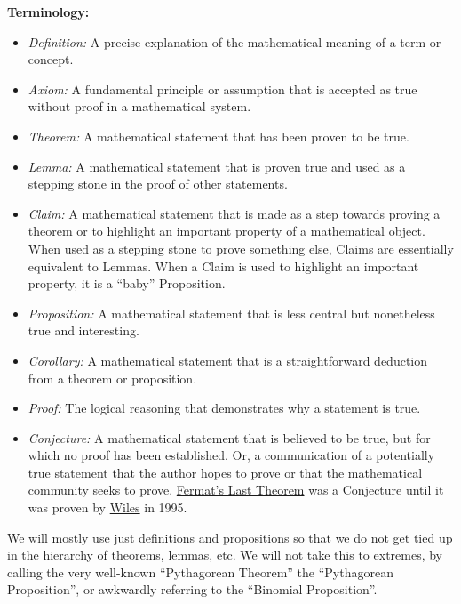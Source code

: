 \textbf{Terminology:}
\begin{itemize}
\item \textit{Definition:} A precise explanation of the mathematical meaning of a term or concept.
\item \textit{Axiom:} A fundamental principle or assumption that is accepted as true without proof in a mathematical system.
\item \textit{Theorem:} A mathematical statement that has been proven to be true.
\item \textit{Lemma:} A mathematical statement that is proven true and used as a stepping stone in the proof of other statements.
\item \textit{Claim:} A mathematical statement that is made as a step towards proving a theorem or to highlight an important property of a mathematical object. When used as a stepping stone to prove something else, Claims are essentially equivalent to Lemmas. When a Claim is used to highlight an important property, it is a ``baby'' Proposition.  
\item \textit{Proposition:} A mathematical statement that is less central but nonetheless true and interesting.
\item \textit{Corollary:} A mathematical statement that is a straightforward deduction from a theorem or proposition.
\item \textit{Proof:} The logical reasoning that demonstrates why a statement is true.
\item \textit{Conjecture:} A mathematical statement that is believed to be true, but for which no proof has been established. Or, a communication of a potentially true statement that the author hopes to prove or that the mathematical community seeks to prove. \href{https://en.wikipedia.org/wiki/Fermat%27s_Last_Theorem}{Fermat's Last Theorem} was a Conjecture until it was proven by \href{https://en.wikipedia.org/wiki/Wiles%27s_proof_of_Fermat%27s_Last_Theorem}{Wiles} in 1995.
\end{itemize}

We will mostly use just definitions and propositions so that we do not get tied up in the hierarchy of theorems, lemmas, etc. We will not take this to extremes, by calling the very well-known ``Pythagorean Theorem'' the ``Pythagorean Proposition'', or awkwardly referring to the ``Binomial Proposition''.

\bigskip

